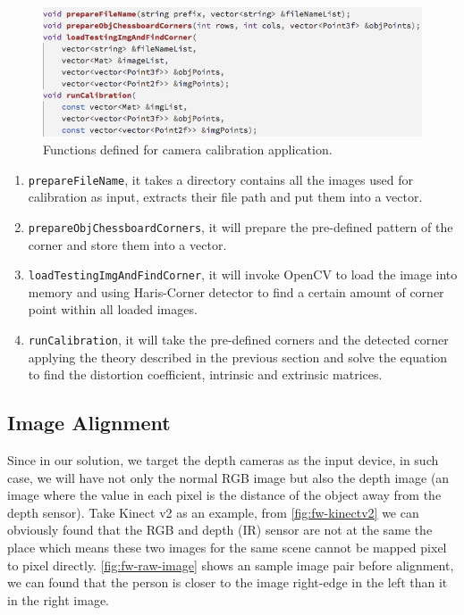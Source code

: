 \begin{figure}
    \includegraphics[width=\linewidth]{figures/framework_calibration_impl.png}
    \caption{Functions defined for camera calibration application.}
    \label{fig:fw-cam-calib-impl}
\end{figure}

\begin{enumerate}
    \item \texttt{prepareFileName}, it takes a directory contains all the images
    used for calibration as input, extracts their file path and put them into a
    vector.
    \item \texttt{prepareObjChessboardCorners}, it will prepare the pre-defined
    pattern of the corner and store them into a vector.
    \item \texttt{loadTestingImgAndFindCorner}, it will invoke OpenCV to load
    the image into memory and using Haris-Corner detector to find a certain
    amount of corner point within all loaded images.
    \item \texttt{runCalibration}, it will take the pre-defined corners and the
    detected corner applying the theory described in the previous section and solve
    the equation to find the distortion coefficient, intrinsic and extrinsic
    matrices.
\end{enumerate}


\subsection{Image Alignment}
\label{sec:Impl-fw-app-align}

Since in our solution, we target the depth cameras as the input device, in such
case, we will have not only the normal RGB image but also the depth image (an
image where the value in each pixel is the distance of the object away from the
depth sensor). Take Kinect v2 as an example, from \autoref{fig:fw-kinectv2} we
can obviously found that the RGB and depth (IR) sensor are not at the same
the place which means these two images for the same scene cannot be mapped pixel to
pixel directly. \autoref{fig:fw-raw-image} shows an sample image pair before
alignment, we can found that the person is closer to the image
right-edge in the left than it in the right image.

